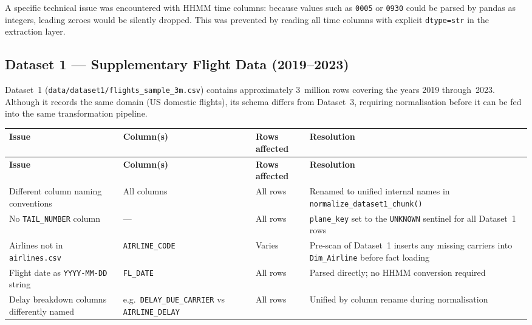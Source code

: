 \documentclass[12pt,a4paper]{article}
\begin{document}
A specific technical issue was encountered with HHMM time columns: because
values such as \texttt{0005} or \texttt{0930} could be parsed by pandas as
integers, leading zeroes would be silently dropped. This was prevented by
reading all time columns with explicit \texttt{dtype=str} in the extraction
layer.

\subsection{Dataset 1 — Supplementary Flight Data (2019–2023)}

Dataset~1 (\texttt{data/dataset1/flights\_sample\_3m.csv}) contains
approximately 3~million rows covering the years 2019 through~2023. Although
it records the same domain (US domestic flights), its schema differs from
Dataset~3, requiring normalisation before it can be fed into the same
transformation pipeline.

\begin{longtable}{>{\raggedright\arraybackslash}p{4.5cm}
                  >{\raggedright\arraybackslash}p{3.5cm}
                  >{\raggedright\arraybackslash}p{2cm}
                  >{\raggedright\arraybackslash}p{4.5cm}}
\toprule
\textbf{Issue} & \textbf{Column(s)} & \textbf{Rows affected} & \textbf{Resolution} \\
\midrule
\endfirsthead
\toprule
\textbf{Issue} & \textbf{Column(s)} & \textbf{Rows affected} & \textbf{Resolution} \\
\midrule
\endhead
\bottomrule
\endfoot

Different column naming conventions &
All columns &
All rows &
Renamed to unified internal names in \texttt{normalize\_dataset1\_chunk()} \\[4pt]

No \texttt{TAIL\_NUMBER} column &
— &
All rows &
\texttt{plane\_key} set to the \texttt{UNKNOWN} sentinel for all Dataset~1 rows \\[4pt]

Airlines not in \texttt{airlines.csv} &
\texttt{AIRLINE\_CODE} &
Varies &
Pre-scan of Dataset~1 inserts any missing carriers into \texttt{Dim\_Airline} before fact loading \\[4pt]

Flight date as \texttt{YYYY-MM-DD} string &
\texttt{FL\_DATE} &
All rows &
Parsed directly; no HHMM conversion required \\[4pt]

Delay breakdown columns differently named &
e.g.\ \texttt{DELAY\_DUE\_CARRIER} vs \texttt{AIRLINE\_DELAY} &
All rows &
Unified by column rename during normalisation \\

\end{longtable}
\end{document}

